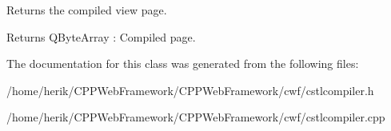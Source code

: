 Returns the compiled view page. 

\begin{DoxyReturn}{Returns}
Q\+Byte\+Array \+: Compiled page. 
\end{DoxyReturn}


The documentation for this class was generated from the following files\+:\begin{DoxyCompactItemize}
\item 
/home/herik/\+C\+P\+P\+Web\+Framework/\+C\+P\+P\+Web\+Framework/cwf/cstlcompiler.\+h\item 
/home/herik/\+C\+P\+P\+Web\+Framework/\+C\+P\+P\+Web\+Framework/cwf/cstlcompiler.\+cpp\end{DoxyCompactItemize}
